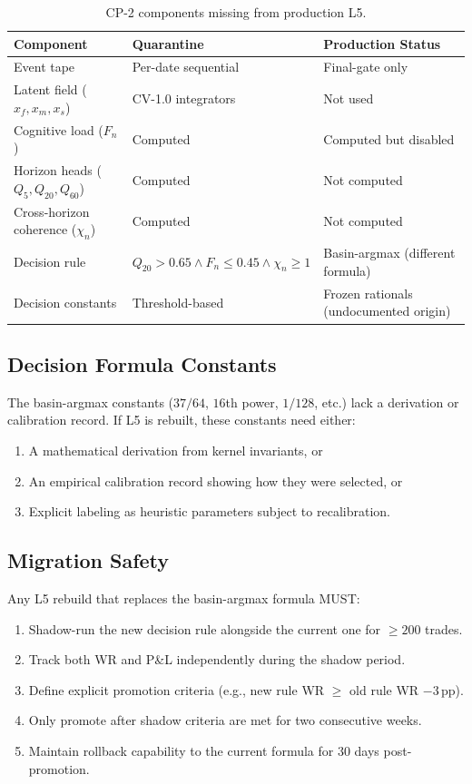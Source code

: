 \documentclass[11pt,a4paper]{article}
\begin{document}
\begin{table}[h]
\centering
\begin{tabular}{@{}llp{7cm}@{}}
\toprule
\textbf{Component} & \textbf{Quarantine} & \textbf{Production Status} \\
\midrule
Event tape & Per-date sequential & Final-gate only \\
Latent field ($x_f, x_m, x_s$) & CV-1.0 integrators & Not used \\
Cognitive load ($F_n$) & Computed & Computed but disabled \\
Horizon heads ($Q_5, Q_{20}, Q_{60}$) & Computed & Not computed \\
Cross-horizon coherence ($\chi_n$) & Computed & Not computed \\
Decision rule & $Q_{20} > 0.65 \wedge F_n \leq 0.45 \wedge \chi_n \geq 1$
    & Basin-argmax (different formula) \\
Decision constants & Threshold-based & Frozen rationals (undocumented origin) \\
\bottomrule
\end{tabular}
\caption{CP-2 components missing from production L5.}
\end{table}

\subsection{Decision Formula Constants}

The basin-argmax constants ($37/64$, $16$th power, $1/128$, etc.) lack a
derivation or calibration record. If L5 is rebuilt, these constants need either:
\begin{enumerate}[label=(\alph*)]
    \item A mathematical derivation from kernel invariants, or
    \item An empirical calibration record showing how they were selected, or
    \item Explicit labeling as heuristic parameters subject to recalibration.
\end{enumerate}

\subsection{Migration Safety}

Any L5 rebuild that replaces the basin-argmax formula MUST:
\begin{enumerate}
    \item Shadow-run the new decision rule alongside the current one for $\geq 200$ trades.
    \item Track both WR and P\&L independently during the shadow period.
    \item Define explicit promotion criteria (e.g., new rule WR $\geq$ old rule WR $- 3$\,pp).
    \item Only promote after shadow criteria are met for two consecutive weeks.
    \item Maintain rollback capability to the current formula for 30 days post-promotion.
\end{enumerate}
\end{document}
